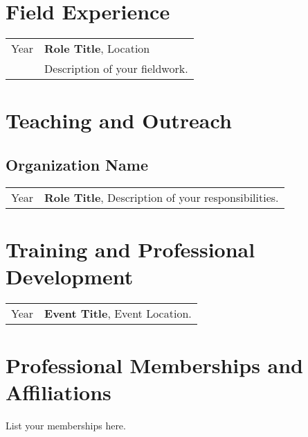 \documentclass[a4paper,10pt]{article}
\begin{document}
\section{Field Experience}
\begin{tabularx}{\textwidth}{>{\raggedright\arraybackslash}p{1cm} X}
Year & \textbf{Role Title}, Location \\
     & Description of your fieldwork.
\end{tabularx}

\section{Teaching and Outreach}
\subsection*{Organization Name}
\begin{tabularx}{\textwidth}{>{\raggedright\arraybackslash}p{2.5cm} X}
Year & \textbf{Role Title}, Description of your responsibilities.
\end{tabularx}

\section{Training and Professional Development}
\begin{tabularx}{\textwidth}{>{\raggedright\arraybackslash}p{1cm} X}
Year & \textbf{Event Title}, Event Location.
\end{tabularx}

\section{Professional Memberships and Affiliations}
    List your memberships here.
\end{document}
